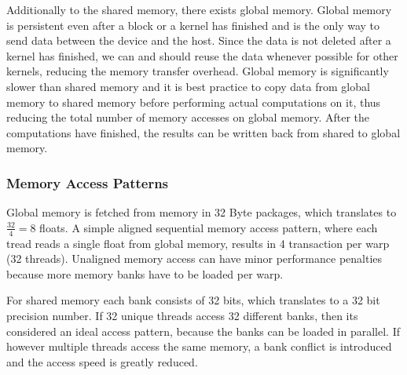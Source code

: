 \documentclass[]{article}
\begin{document}
Additionally to the shared memory, there exists global memory. Global memory is persistent even after a block or a kernel has finished and is the only way to send data between the device and the host. Since the data is not deleted after a kernel has finished, we can and should reuse the data whenever possible for other kernels, reducing the memory transfer overhead. Global memory is significantly slower than shared memory and it is best practice to copy data from global memory to shared memory before performing actual computations on it, thus reducing the total number of memory accesses on global memory. After the computations have finished, the results can be written back from shared to global memory.

\subsubsection{Memory Access Patterns}

Global memory is fetched from memory in 32 Byte packages, which translates to $\frac{32}{4} = 8$ floats. A simple aligned sequential memory access pattern, where each tread reads a single float from global memory, results in 4 transaction per warp (32 threads). Unaligned memory access can have minor performance penalties because more memory banks have to be loaded per warp. 

For shared memory each bank consists of 32 bits, which translates to a 32 bit precision number. If 32 unique threads access 32 different banks, then its considered an ideal access pattern, because the banks can be loaded in parallel. If however multiple threads access the same memory, a bank conflict is introduced and the access speed is greatly reduced.
\end{document}
